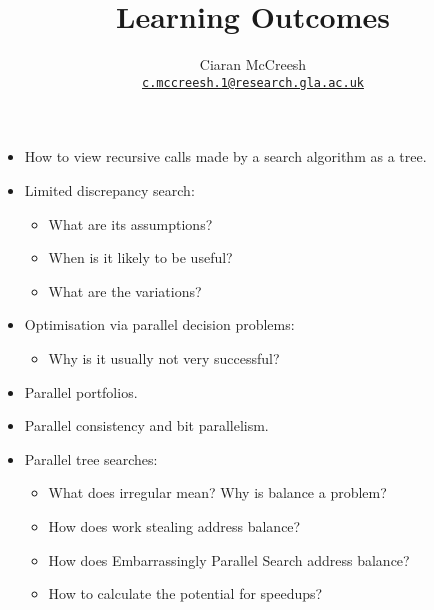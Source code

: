 \documentclass[a4paper]{article}
\title{Learning Outcomes}
\author{
    Ciaran McCreesh%
    \\ \href{mailto:c.mccreesh.1@research.gla.ac.uk}{\nolinkurl{c.mccreesh.1@research.gla.ac.uk}}
}
\begin{document}
\makeatletter
\vspace*{1cm}\noindent{\centering\Large\bfseries \@title \par}
\vspace*{1cm}\noindent{\centering \@author \par}
\vspace*{0.5cm}\noindent{\centering \@date \par}
\vspace*{0.5cm}
\makeatother

\begin{itemize}
    \item How to view recursive calls made by a search algorithm as a tree.
    \item Limited discrepancy search:
        \begin{itemize}
            \item What are its assumptions?
            \item When is it likely to be useful?
            \item What are the variations?
        \end{itemize}

    \item Optimisation via parallel decision problems:
        \begin{itemize}
            \item Why is it usually not very successful?
        \end{itemize}

    \item Parallel portfolios.

    \item Parallel consistency and bit parallelism.

    \item Parallel tree searches:
        \begin{itemize}
            \item What does irregular mean? Why is balance a problem?

            \item How does work stealing address balance?

            \item How does Embarrassingly Parallel Search address balance?

            \item How to calculate the potential for speedups?
        \end{itemize}
\end{itemize}
\end{document}
